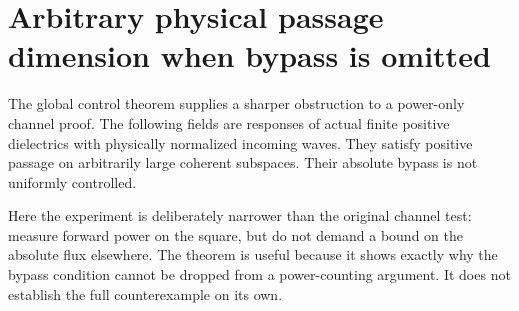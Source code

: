 \section{Arbitrary physical passage dimension when bypass is omitted}
\label{cp:section}

The global control theorem supplies a sharper obstruction to a power-only
channel proof. The following fields are responses of actual finite positive
dielectrics with physically normalized incoming waves. They satisfy positive
passage on arbitrarily large coherent subspaces. Their absolute bypass is
not uniformly controlled.

Here the experiment is deliberately narrower than the original channel
test: measure forward power on the square, but do not demand a bound on
the absolute flux elsewhere. The theorem is useful because it shows exactly
why the bypass condition cannot be dropped from a power-counting argument.
It does not establish the full counterexample on its own.

